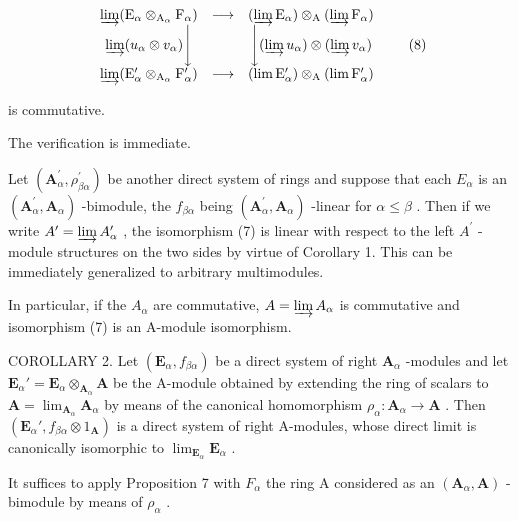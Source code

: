 \[
\begin{array}{c c c} \varinjlim (\mathrm{E} _ {\alpha} \otimes_ {\mathrm{A} _ {\alpha}} \mathrm{F} _ {\alpha}) & \longrightarrow & (\varinjlim \mathrm{E} _ {\alpha}) \otimes_ {\mathrm{A}} (\varinjlim \mathrm{F} _ {\alpha}) \\ \varinjlim (u _ {\alpha} \otimes v _ {\alpha}) \Bigg \downarrow & & \Bigg \downarrow (\varinjlim u _ {\alpha}) \otimes (\varinjlim v _ {\alpha}) \\ \varinjlim (\mathrm{E} _ {\alpha} ^ {\prime} \otimes_ {\mathrm{A} _ {\alpha}} \mathrm{F} _ {\alpha} ^ {\prime}) & \longrightarrow & (\lim \mathrm{E} _ {\alpha} ^ {\prime}) \otimes_ {\mathrm{A}} (\lim \mathrm{F} _ {\alpha} ^ {\prime}) \end{array}\tag{8}
\]

is commutative.

The verification is immediate.

Let \((\mathbf{A}_{\alpha}^{\prime}, \rho_{\beta\alpha}^{\prime})\) be another direct system of rings and suppose that each \(E_{\alpha}\) is an \((\mathbf{A}_{\alpha}^{\prime}, \mathbf{A}_{\alpha})\) -bimodule, the \(f_{\beta\alpha}\) being \((\mathbf{A}_{\alpha}^{\prime}, \mathbf{A}_{\alpha})\) -linear for \(\alpha \leqslant \beta\) . Then if we write \(A^{\prime} = \varinjlim A_{\alpha}^{\prime}\) , the isomorphism (7) is linear with respect to the left \(A^{\prime}\) -module structures on the two sides by virtue of Corollary 1. This can be immediately generalized to arbitrary multimodules.

In particular, if the \(A_{\alpha}\) are commutative, \(A = \varinjlim A_{\alpha}\) is commutative and isomorphism (7) is an A-module isomorphism.

COROLLARY 2. Let \((\mathbf{E}_{\alpha}, f_{\beta \alpha})\) be a direct system of right \(\mathbf{A}_{\alpha}\) -modules and let \(\mathbf{E}_{\alpha}' = \mathbf{E}_{\alpha} \otimes_{\mathbf{A}_{\alpha}} \mathbf{A}\) be the A-module obtained by extending the ring of scalars to \(\mathbf{A} = \lim_{\mathbf{A}_{\alpha}} \mathbf{A}_{\alpha}\) by means of the canonical homomorphism \(\rho_{\alpha}: \mathbf{A}_{\alpha} \to \mathbf{A}\) . Then \((\mathbf{E}_{\alpha}', f_{\beta \alpha} \otimes 1_{\mathbf{A}})\) is a direct system of right A-modules, whose direct limit is canonically isomorphic to \(\lim_{\mathbf{E}_{\alpha}} \mathbf{E}_{\alpha}\) .

It suffices to apply Proposition 7 with \(F_{\alpha}\) the ring A considered as an \((\mathbf{A}_{\alpha}, \mathbf{A})\) -bimodule by means of \(\rho_{\alpha}\) .

